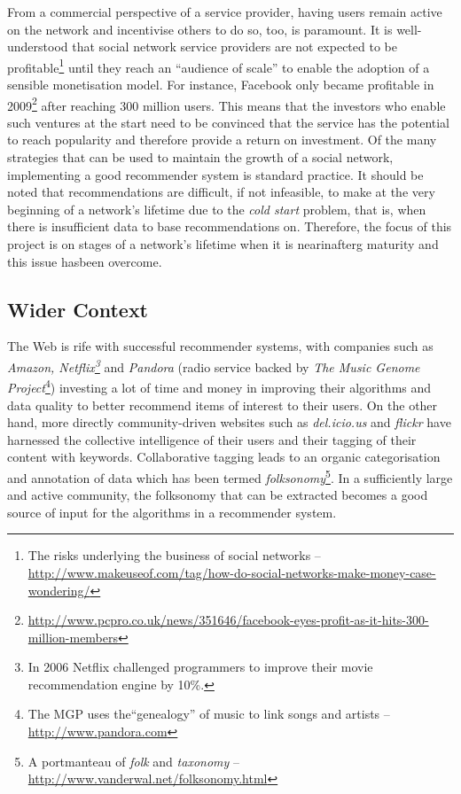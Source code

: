 \documentclass[a4paper,12pt,twoside,notitlepage]{report}
\begin{document}
From a commercial perspective of a service provider, having users remain active
on the network and incentivise others to do so, too, is paramount. It is
well-understood that social network service providers are not expected to be
profitable\footnote{The 
risks underlying the business of social networks -- 
\url{http://www.makeuseof.com/tag/how-do-social-networks-make-money-case-wondering/}} 
until they reach an ``audience of scale'' to enable the adoption of a sensible 
monetisation model. For instance, Facebook only became profitable in 2009\footnote{
\url{http://www.pcpro.co.uk/news/351646/facebook-eyes-profit-as-it-hits-300-million-members}} 
after reaching 300 million users. This means that the investors who enable such 
ventures at the start need to be convinced that the service has the potential 
to reach popularity and therefore provide a return on investment. Of the many 
strategies that can be used to maintain the growth of a social network, 
implementing a good recommender system is standard practice. It should be noted 
that recommendations are difficult, if not infeasible, to make at the very 
beginning of a network's lifetime due to the \emph{cold start} problem, that 
is, when there is insufficient data to base recommendations on. Therefore, the 
focus of this project is on stages of a network's lifetime when it is
nearinafterg maturity and this issue hasbeen overcome.

\subsection{Wider Context}

The Web is rife with successful recommender systems, with companies such as 
\emph{Amazon, Netflix\footnote{In 2006 Netflix challenged programmers to 
improve their movie recommendation engine by 10\%.}} and \emph{Pandora} 
(radio service backed by \emph{The Music Genome Project}\footnote{The MGP 
uses the``genealogy'' of music to link songs and artists -- 
\url{http://www.pandora.com}}) investing a lot of time and money in improving 
their algorithms and data quality to better recommend items of interest to 
their users. On the other hand, more directly community-driven websites such as 
\emph{del.icio.us} and \emph{flickr} have harnessed the collective 
intelligence of their users and their tagging of their content with keywords. 
Collaborative tagging leads to an organic categorisation and annotation of data 
which has been termed \emph{folksonomy}\footnote{A portmanteau of 
\emph{folk} and \emph{taxonomy} -- 
\url{http://www.vanderwal.net/folksonomy.html}}. In a sufficiently large and 
active community, the folksonomy that can be extracted becomes a good source of 
input for the algorithms in a recommender system. 
\end{document}
